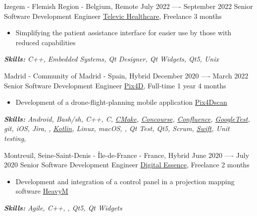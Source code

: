 \documentclass[11pt,a4paper,roman]{moderncv}
\begin{document}
\cventry
{Izegem - Flemish Region - Belgium, Remote}
{July 2022 —- September 2022}
{Senior Software Development Engineer}
{\href{https://www.televic.com/en/healthcare}{Televic Healthcare}, Freelance}
{3 months}
{}
{
\begin{itemize}
	\item Simplifying the patient assistance interface for easier use by those with reduced capabilities
\end{itemize}
{\textcolor{color2}{\textit{\textbf{Skills:}
	C++,
	Embedded Systems,
	Qt Designer,
	Qt Widgets,
	Qt5,
	Unix
	\newline
}}}}


\cventry
{Madrid - Community of Madrid - Spain, Hybrid}
{December 2020 —- March 2022}
{Senior Software Development Engineer}
{\href{https://www.pix4d.com}{Pix4D}, Full-time}
{1 year 4 months}
{}
{
\begin{itemize}
	\item Development of a drone-flight-planning mobile application \href{https://www.pix4d.com/es/producto/pix4dscan}{Pix4Dscan}
\end{itemize}
{\textcolor{color2}{\textit{\textbf{Skills:}
	Android,
	Bash/sh,
	C++,
	C,
	\href{https://cmake.org}{CMake},
	\href{https://concourse-ci.org}{Concourse},
	\href{https://www.atlassian.com/software/confluence}{Confluence},
	\href{https://github.com/google/googletest}{GoogleTest},
	git,
	iOS,
	Jira,
	,
	\href{https://kotlinlang.org}{Kotlin},
	Linux,
	macOS,
	,
	Qt Test,
	Qt5,
	Scrum,
	\href{https://swift.org}{Swift},
	Unit testing,
	\newline
}}}}


\cventry
{Montreuil, Seine-Saint-Denis - Île-de-France - France, Hybrid}
{June 2020 —- July 2020}
{Senior Software Development Engineer}
{\href{https://digitalessence.fr/en}{Digital Essence}, Freelance}
{2 months}
{}
{
\begin{itemize}
\item Development and integration of a control panel in a projection mapping software \href{https://www.heavym.net}{HeavyM}
\end{itemize}
{\textcolor{color2}{\textit{\textbf{Skills:}
	Agile,
	C++,
	,
	Qt5,
	Qt Widgets
	\newline
}}}}
\end{document}
